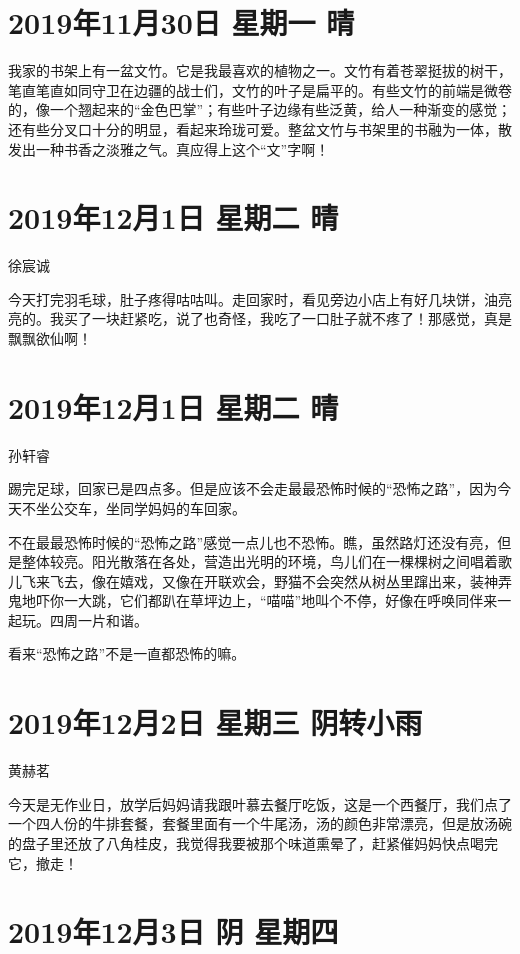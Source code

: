 \section{2019年11月30日 星期一 晴}

我家的书架上有一盆文竹。它是我最喜欢的植物之一。文竹有着苍翠挺拔的树干，笔直笔直如同守卫在边疆的战士们，文竹的叶子是扁平的。有些文竹的前端是微卷的，像一个翘起来的``金色巴掌''；有些叶子边缘有些泛黄，给人一种渐变的感觉；还有些分叉口十分的明显，看起来玲珑可爱。整盆文竹与书架里的书融为一体，散发出一种书香之淡雅之气。真应得上这个``文''字啊！

\section{2019年12月1日 星期二 晴}

徐宸诚

今天打完羽毛球，肚子疼得咕咕叫。走回家时，看见旁边小店上有好几块饼，油亮亮的。我买了一块赶紧吃，说了也奇怪，我吃了一口肚子就不疼了！那感觉，真是飘飘欲仙啊！

\section{2019年12月1日 星期二 晴}

孙轩睿

踢完足球，回家已是四点多。但是应该不会走最最恐怖时候的``恐怖之路''，因为今天不坐公交车，坐同学妈妈的车回家。

不在最最恐怖时候的``恐怖之路''感觉一点儿也不恐怖。瞧，虽然路灯还没有亮，但是整体较亮。阳光散落在各处，营造出光明的环境，鸟儿们在一棵棵树之间唱着歌儿飞来飞去，像在嬉戏，又像在开联欢会，野猫不会突然从树丛里蹿出来，装神弄鬼地吓你一大跳，它们都趴在草坪边上，``喵喵''地叫个不停，好像在呼唤同伴来一起玩。四周一片和谐。

看来``恐怖之路''不是一直都恐怖的嘛。

\section{2019年12月2日 星期三 阴转小雨}

黄赫茗

今天是无作业日，放学后妈妈请我跟叶慕去餐厅吃饭，这是一个西餐厅，我们点了一个四人份的牛排套餐，套餐里面有一个牛尾汤，汤的颜色非常漂亮，但是放汤碗的盘子里还放了八角桂皮，我觉得我要被那个味道熏晕了，赶紧催妈妈快点喝完它，撤走！

\section{2019年12月3日 阴 星期四}

